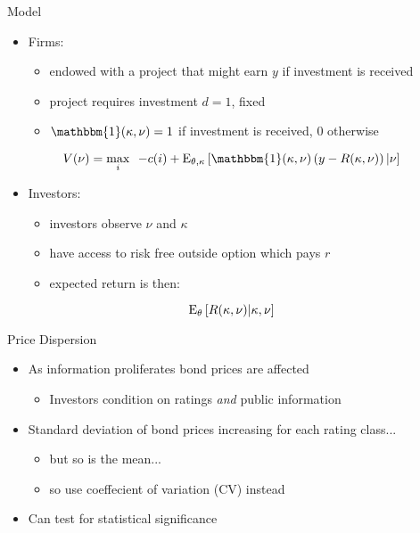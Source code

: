 \documentclass{beamer}
\begin{document}
\begin{frame}{Model}
\begin{itemize}
	\item Firms:
	\begin{itemize}
		\item endowed with a project that might earn $y$ if investment is received
		\item project requires investment $d=1$, fixed
		\item $\mathbbm{1}(\kappa,\nu)=1$ if investment is received, 0 otherwise
	\end{itemize}
\end{itemize}
\begin{equation}
	\label{eq:FP}V(\nu)=\max_{i} \,\,\, -c(i)+\textup{E}_{\theta,\kappa}\left [ \mathbbm{1}(\kappa,\nu) \left (y - R(\kappa,\nu) \right )|\nu\right ]
\end{equation}
\begin{itemize}
	\item Investors:
	\begin{itemize}
		\item investors observe $\nu$ and $\kappa$
		\item have access to risk free outside option which pays $r$
		\item expected return is then:
	\end{itemize}
\end{itemize}
\begin{equation}
	\textup{E}_{\theta} \left [R(\kappa,\nu)|\kappa,\nu \right ]
\end{equation}
\end{frame}


\begin{frame}{Price Dispersion}
\begin{itemize}
	\item As information proliferates bond prices are affected
	\begin{itemize}
		\item Investors condition on ratings \textit{and} public information
	\end{itemize}
	\item Standard deviation of bond prices increasing for each rating class...
	\begin{itemize}
		\item but so is the mean...
		\item so use coeffecient of variation (CV) instead
	\end{itemize}
	\item Can test for statistical significance
\end{itemize}
\end{frame}

{

}
\end{document}
